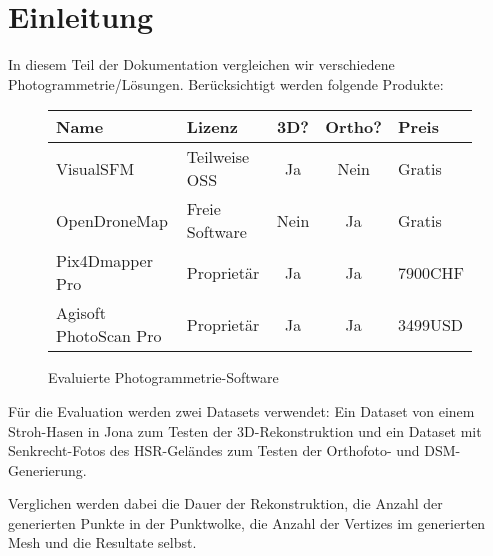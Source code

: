\chapter{Einleitung}

\label{ch:eval-intro}


In diesem Teil der Dokumentation vergleichen wir verschiedene
Photogrammetrie\-/Lösungen. Berücksichtigt werden folgende Produkte:

\begin{figure}[H]
	\begin{tabular}[H]{llccl}
		\toprule
		\textbf{Name} & \textbf{Lizenz} & \textbf{3D?} & \textbf{Ortho?} & \textbf{Preis} \\
		\midrule
		VisualSFM & Teilweise OSS & Ja & Nein & Gratis \\
		OpenDroneMap & Freie Software & Nein & Ja & Gratis \\
		Pix4Dmapper Pro & Proprietär & Ja & Ja & 7900CHF \\
		Agisoft PhotoScan Pro & Proprietär & Ja & Ja & 3499USD \\
		\bottomrule
	\end{tabular}
	\caption{Evaluierte Photogrammetrie-Software}
	\label{table:eval:software}
\end{figure}

Für die Evaluation werden zwei Datasets verwendet: Ein Dataset von einem
Stroh-Hasen in Jona zum Testen der 3D-Rekonstruktion und ein Dataset mit
Senkrecht-Fotos des HSR-Geländes zum Testen der Orthofoto- und DSM-Generierung.

Verglichen werden dabei die Dauer der Rekonstruktion, die Anzahl der generierten
Punkte in der Punktwolke, die Anzahl der Vertizes im generierten Mesh und die
Resultate selbst.

